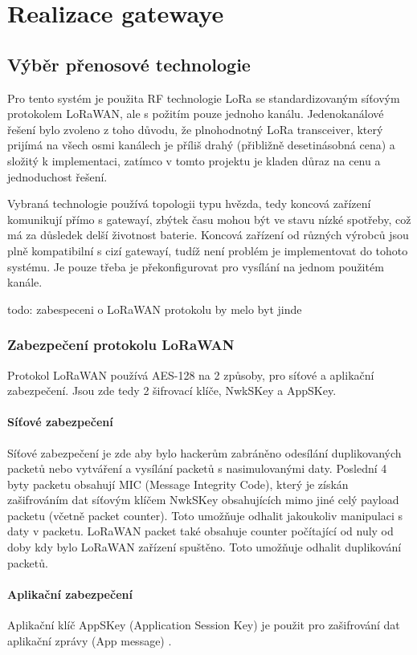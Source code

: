 \chapter{Realizace gatewaye}

\section{Výběr přenosové technologie}
Pro tento systém je použita RF technologie LoRa se standardizovaným síťovým protokolem LoRaWAN, ale s požitím pouze jednoho kanálu.
Jedenokanálové řešení bylo zvoleno z toho důvodu, že plnohodnotný LoRa transceiver, který prijímá na všech osmi kanálech je příliš drahý (přibližně desetinásobná cena) a složitý k implementaci, zatímco v tomto projektu je kladen důraz na cenu a jednoduchost řešení.

Vybraná technologie používá topologii typu hvězda, tedy koncová zařízení komunikují přímo s gatewayí, zbýtek času mohou být ve stavu nízké spotřeby, což má za důsledek delší životnost baterie.
Koncová zařízení od různých výrobců jsou plně kompatibilní s cizí gatewayí, tudíž není problém je implementovat do tohoto systému. Je pouze třeba je překonfigurovat pro vysílání na jednom použitém kanále.

todo: zabespeceni o LoRaWAN protokolu by melo byt jinde

\subsection{Zabezpečení protokolu LoRaWAN}
Protokol LoRaWAN používá AES-128 na 2 způsoby, pro síťové a aplikační zabezpečení. Jsou zde tedy 2 šifrovací klíče, NwkSKey a AppSKey.

\subsubsection{Síťové zabezpečení}
Síťové zabezpečení je zde aby bylo hackerům zabráněno odesílání duplikovaných packetů nebo vytváření a vysílání packetů s nasimulovanými daty.
Poslední 4 byty packetu obsahují MIC (Message Integrity Code), který je získán zašifrováním dat síťovým klíčem NwkSKey obsahujících mimo jiné celý payload packetu (včetně packet counter). Toto umožňuje odhalit jakoukoliv manipulaci s daty v packetu. LoRaWAN packet také obsahuje counter počítající od nuly od doby kdy bylo LoRaWAN zařízení spuštěno. Toto umožňuje odhalit duplikování packetů.


\subsubsection{Aplikační zabezpečení}
Aplikační klíč AppSKey (Application Session Key) je použit pro zašifrování dat aplikační zprávy (App message) \cite{lwSpec} \cite{lwSecur}.


